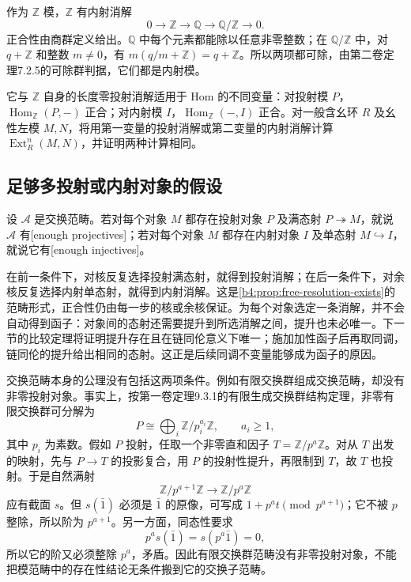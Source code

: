 \begin{example}\label{b4:exm:integer-injective-resolution}
	作为 \(\mathbb Z\) 模，\(\mathbb Z\) 有内射消解
	\[
		0\longrightarrow\mathbb Z\longrightarrow\mathbb Q \longrightarrow\mathbb Q/\mathbb Z\longrightarrow0.
	\]
	正合性由商群定义给出。\(\mathbb Q\) 中每个元素都能除以任意非零整数；在 \(\mathbb Q/\mathbb Z\) 中，对 \(q+\mathbb Z\) 和整数 \(m\ne0\)，有 \(m(q/m+\mathbb Z)=q+\mathbb Z\)。所以两项都可除，由第二卷定理7.2.5的可除群判据，它们都是内射模。

	它与 \(\mathbb Z\) 自身的长度零投射消解适用于 Hom 的不同变量：对投射模 \(P\)，\(\operatorname{Hom}_{\mathbb Z}(P,-)\) 正合；对内射模 \(I\)，\(\operatorname{Hom}_{\mathbb Z}(-,I)\) 正合。对一般含幺环 \(R\) 及幺性左模 \(M,N\)，将用第一变量的投射消解或第二变量的内射消解计算 \(\operatorname{Ext}_R^n(M,N)\)，并证明两种计算相同。
\end{example}

\subsection{足够多投射或内射对象的假设}
\label{b4:subsec:0701:03}

\begin{definition}\label{b4:def:enough-projectives-injectives}
	设 \(\mathcal A\) 是交换范畴。若对每个对象 \(M\) 都存在投射对象 \(P\) 及满态射 \(P\twoheadrightarrow M\)，就说 \(\mathcal A\) 有[enough projectives]；若对每个对象 \(M\) 都存在内射对象 \(I\) 及单态射 \(M\hookrightarrow I\)，就说它有[enough injectives]。
\end{definition}

在前一条件下，对核反复选择投射满态射，就得到投射消解；在后一条件下，对余核反复选择内射单态射，就得到内射消解。这是\cref{b4:prop:free-resolution-exists}的范畴形式，正合性仍由每一步的核或余核保证。为每个对象选定一条消解，并不会自动得到函子：对象间的态射还需要提升到所选消解之间，提升也未必唯一。下一节的比较定理将证明提升存在且在链同伦意义下唯一；施加加性函子后再取同调，链同伦的提升给出相同的态射。这正是后续同调不变量能够成为函子的原因。

\ProseParagraphBreak
交换范畴本身的公理没有包括这两项条件。例如有限交换群组成交换范畴，却没有非零投射对象。事实上，按第一卷定理9.3.1的有限生成交换群结构定理，非零有限交换群可分解为
\[
	P\cong\bigoplus_i\mathbb Z/p_i^{a_i}\mathbb Z, \qquad a_i\ge1,
\]
其中 \(p_i\) 为素数。假如 \(P\) 投射，任取一个非零直和因子 \(T=\mathbb Z/p^a\mathbb Z\)。对从 \(T\) 出发的映射，先与 \(P\to T\) 的投影复合，用 \(P\) 的投射性提升，再限制到 \(T\)，故 \(T\) 也投射。于是自然满射
\[
	\mathbb Z/p^{a+1}\mathbb Z\longrightarrow\mathbb Z/p^a\mathbb Z
\]
应有截面 \(s\)。但 \(s(\bar1)\) 必须是 \(\bar1\) 的原像，可写成 \(1+p^at\pmod{p^{a+1}}\)；它不被 \(p\) 整除，所以阶为 \(p^{a+1}\)。另一方面，同态性要求
\[
	p^a s(\bar1)=s(p^a\bar1)=0,
\]
所以它的阶又必须整除 \(p^a\)，矛盾。因此有限交换群范畴没有非零投射对象，不能把模范畴中的存在性结论无条件搬到它的交换子范畴。

